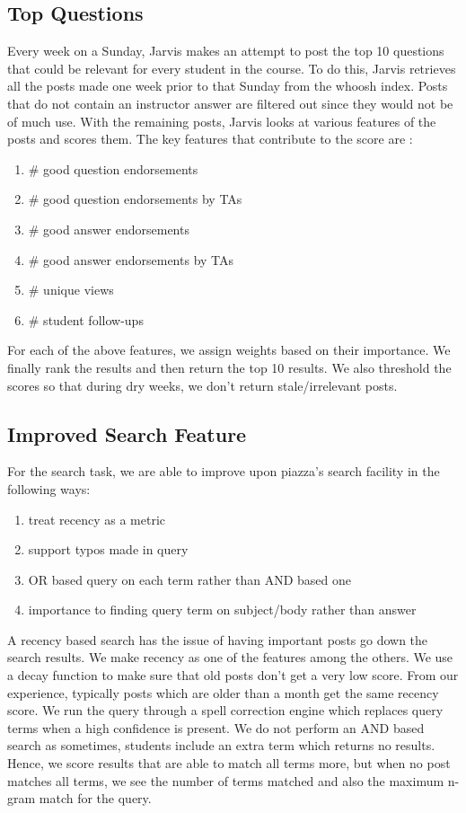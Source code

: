 \documentclass[sigconf]{acmart}
\begin{document}
\subsection{Top Questions}
Every week on a Sunday, Jarvis makes an attempt to post the top 10 questions that could be relevant for every student in the course. To do this, Jarvis retrieves all the posts made one week prior to that Sunday from the whoosh index. Posts that do not contain an instructor answer are filtered out since they would not be of much use. With the remaining posts, Jarvis looks at various features of the posts and scores them. The key features that contribute to the score are :

\begin{enumerate}
  \item \# good question endorsements
  \item \# good question endorsements by TAs
  \item \# good answer endorsements
  \item \# good answer endorsements by TAs
  \item \# unique views
  \item \# student follow-ups
\end{enumerate}

For each of the above features, we assign weights based on their importance. We finally rank the results and then return the top 10 results. We also threshold the scores so that during dry weeks, we don't return stale/irrelevant posts.

\subsection{Improved Search Feature}
For the search task, we are able to improve upon piazza's search facility in the following ways:
\begin{enumerate}
\item treat recency as a metric
\item support typos made in query
\item OR based query on each term rather than AND based one
\item importance to finding query term on subject/body rather than answer
\end{enumerate}

A recency based search has the issue of having important posts go down the search results. We make recency as one of the features among the others. We use a decay function to make sure that old posts don't get a very low score. From our experience, typically posts which are older than a month get the same recency score. We run the query through a spell correction engine which replaces query terms when a high confidence is present. We do not perform an AND based search as sometimes, students include an extra term which returns no results. Hence, we score results that are able to match all terms more, but when no post matches all terms, we see the number of terms matched and also the maximum n-gram match for the query. 
\end{document}
